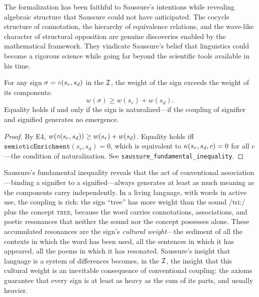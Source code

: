 The formalization has been faithful to Saussure's intentions while
revealing algebraic structure that Saussure could not have anticipated.
The cocycle structure of connotation, the hierarchy of equivalence
relations, and the wave-like character of structural opposition are
genuine discoveries enabled by the mathematical framework. They
vindicate Saussure's belief that linguistics could become a rigorous
science while going far beyond the scientific tools available in his
time.

\begin{theorem}
\label{thm:saussure-inequality}
For any sign $\sigma = \circ(s_r, s_d)$ in the $\mathcal{I}$, the weight of the sign exceeds the weight of its components:
\[
  w(\sigma) \geq w(s_r) + w(s_d).
\]
Equality holds if and only if the sign is naturalized---if the coupling of signifier and signified generates no emergence.
\end{theorem}

\begin{proof}
By E4, $w(\circ(s_r, s_d)) \geq w(s_r) + w(s_d)$. Equality holds iff $\texttt{semioticEnrichment}(s_r, s_d) = 0$, which is equivalent to $\kappa(s_r, s_d, c) = 0$ for all $c$---the condition of naturalization. See \texttt{saussure\_fundamental\_inequality}.
\end{proof}

\begin{interpretation}
Saussure's fundamental inequality reveals that the act of conventional association---binding a signifier to a signified---always generates at least as much meaning as the components carry independently. In a living language, with words in active use, the coupling is rich: the sign ``tree'' has more weight than the sound /tri:/ plus the concept \textsc{tree}, because the word carries connotations, associations, and poetic resonances that neither the sound nor the concept possesses alone. These accumulated resonances are the sign's \emph{cultural weight}---the sediment of all the contexts in which the word has been used, all the sentences in which it has appeared, all the poems in which it has resonated. Saussure's insight that language is a system of differences becomes, in the $\mathcal{I}$, the insight that this cultural weight is an inevitable consequence of conventional coupling: the axioms guarantee that every sign is at least as heavy as the sum of its parts, and usually heavier.
\end{interpretation}

